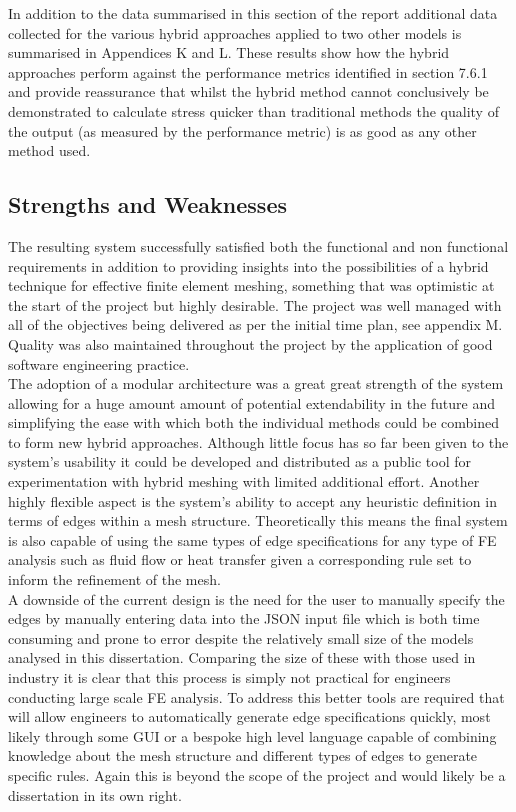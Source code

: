 \noindent
In addition to the data summarised in this section of the report additional data collected for the various hybrid approaches applied to two other models is summarised in Appendices K and L. These results show how the hybrid approaches perform against the performance metrics identified in section 7.6.1 and provide reassurance that whilst the hybrid method cannot conclusively be demonstrated to calculate stress quicker than traditional methods the quality of the output (as measured by the performance metric) is as good as any other method used. 


\subsection{Strengths and Weaknesses}
The resulting system successfully satisfied both the functional and non functional requirements in addition to providing insights into the possibilities of a hybrid technique for effective finite element meshing, something that was optimistic at the start of the project but highly desirable. The project was well managed with all of the objectives being delivered as per the initial time plan, see appendix M. Quality was also maintained throughout the project by the application of good software engineering practice. \\

\noindent
The adoption of a modular architecture was a great great strength of the system allowing for a huge amount amount of potential extendability in the future and simplifying the ease with which both the individual methods could be combined to form new hybrid approaches. Although little focus has so far been given to the system's usability it could be developed and distributed as a public tool for experimentation with hybrid meshing with limited additional effort. Another highly flexible aspect is the system's ability to accept any heuristic definition in terms of edges within a mesh structure. Theoretically this means the final system is also capable of using the same types of edge specifications for any type of FE analysis such as fluid flow or heat transfer given a corresponding rule set to inform the refinement of the mesh. \\


\noindent
A downside of the current design is the need for the user to manually specify the edges by manually entering data into the JSON input file which is both time consuming and prone to error despite the relatively small size of the models analysed in this dissertation. Comparing the size of these with those used in industry it is clear that this process is simply not practical for engineers conducting large scale FE analysis. To address this better tools are required that will allow engineers to automatically generate edge specifications quickly, most likely through some GUI or a bespoke high level language capable of combining knowledge about the mesh structure and different types of edges to generate specific rules. Again this is beyond the scope of the project and would likely be a dissertation in its own right. \\


